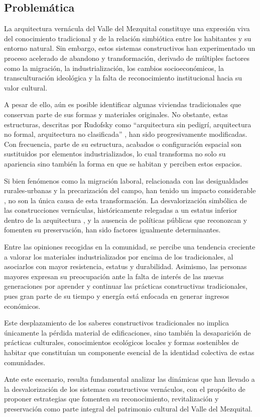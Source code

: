 \subsection{Problemática}

La arquitectura vernácula del Valle del Mezquital constituye una expresión viva del conocimiento tradicional y de la relación simbiótica entre los habitantes y su entorno natural. Sin embargo, estos sistemas constructivos han experimentado un proceso acelerado de abandono y transformación, derivado de múltiples factores como la migración, la industrialización, los cambios socioeconómicos, la transculturación ideológica y la falta de reconocimiento institucional hacia su valor cultural.

A pesar de ello, aún es posible identificar algunas viviendas tradicionales que conservan parte de sus formas y materiales originales. No obstante, estas estructuras, descritas por Rudofsky como ``arquitectura sin pedigrí, arquitectura no formal, arquitectura no clasificada'' \citep[p. 9]{rudofsky1964}, han sido progresivamente modificadas. Con frecuencia, parte de su estructura, acabados o configuración espacial son sustituidos por elementos industrializados, lo cual transforma no solo su apariencia sino también la forma en que se habitan y perciben estos espacios.

Si bien fenómenos como la migración laboral, relacionada con las desigualdades rurales-urbanas y la precarización del campo, han tenido un impacto considerable \citep{monroy2009, boils2010dadho}, no son la única causa de esta transformación. La desvalorización simbólica de las construcciones vernáculas, históricamente relegadas a un estatus inferior dentro de la arquitectura \citep[p. 2]{torres1999revista}, y la ausencia de políticas públicas que reconozcan y fomenten su preservación, han sido factores igualmente determinantes.

Entre las opiniones recogidas en la comunidad, se percibe una tendencia creciente a valorar los materiales industrializados por encima de los tradicionales, al asociarlos con mayor resistencia, estatus y durabilidad. Asimismo, las personas mayores expresan su preocupación ante la falta de interés de las nuevas generaciones por aprender y continuar las prácticas constructivas tradicionales, pues gran parte de su tiempo y energía está enfocada en generar ingresos económicos.

Este desplazamiento de los saberes constructivos tradicionales no implica únicamente la pérdida material de edificaciones, sino también la desaparición de prácticas culturales, conocimientos ecológicos locales y formas sostenibles de habitar que constituían un componente esencial de la identidad colectiva de estas comunidades.

Ante este escenario, resulta fundamental analizar las dinámicas que han llevado a la desvalorización de los sistemas constructivos vernáculos, con el propósito de proponer estrategias que fomenten su reconocimiento, revitalización y preservación como parte integral del patrimonio cultural del Valle del Mezquital.
